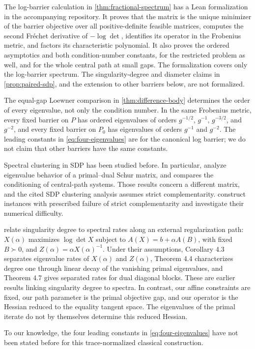 The log-barrier calculation in \cref{thm:fractional-spectrum} has a
Lean formalization in the accompanying repository. It proves that
the matrix is the unique minimizer of the barrier objective over all
positive-definite feasible matrices, computes the second Fr\'echet
derivative of $-\log\det$, identifies its operator in the Frobenius metric,
and factors its characteristic polynomial. It also proves the ordered
asymptotics and both condition-number constants, for the restricted
problem as well, and for the whole central path at small gaps. The formalization covers
only the log-barrier spectrum. The singularity-degree and diameter claims
in \cref{prop:paired-sdp}, and the extension to other barriers below,
are not formalized.

The equal-gap Loewner comparison in \cref{thm:difference-body}
determines the order of every eigenvalue, not only the condition
number. In the same Frobenius metric,
every fixed barrier on $P$ has ordered eigenvalues of orders
$g^{-1/2}$, $g^{-1}$, $g^{-3/2}$, and $g^{-2}$, and every fixed barrier
on $P_0$ has eigenvalues of orders $g^{-1}$ and $g^{-2}$. The leading
constants in \eqref{eq:four-eigenvalues} are for the canonical log
barrier; we do not claim that other barriers have the same constants.

Spectral clustering in SDP has been studied before. In particular,
\citet[Section 4]{alizadeh1998} analyze eigenvalue behavior of a
primal--dual Schur matrix, and \citet[Section 3.3]{pena2002}
compares the conditioning of central-path systems. Those results
concern a different matrix, and the cited SDP clustering analysis
assumes strict complementarity. \citet{wei2010} construct instances with prescribed
failure of strict complementarity and investigate their numerical
difficulty.

\citet[Section 4]{sremac2021} relate singularity degree to spectral rates
along an external regularization path: $X(\alpha)$ maximizes
$\log\det X$ subject to $A(X)=b+\alpha A(B)$, with fixed $B\succ0$,
and $Z(\alpha)=\alpha X(\alpha)^{-1}$. Under their assumptions,
Corollary 4.3 separates eigenvalue rates of $X(\alpha)$ and
$Z(\alpha)$, Theorem 4.4 characterizes degree one through linear
decay of the vanishing primal eigenvalues, and Theorem 4.7 gives
separated rates for dual diagonal blocks. These are earlier results
linking singularity degree to spectra. In contrast,
our affine constraints are fixed, our path parameter is the primal
objective gap, and our operator is the Hessian reduced to the equality
tangent space. The eigenvalues of the primal iterate do not by
themselves determine this reduced Hessian.

To our knowledge, the four
leading constants in \eqref{eq:four-eigenvalues} have not been stated
before for this trace-normalized classical construction.
